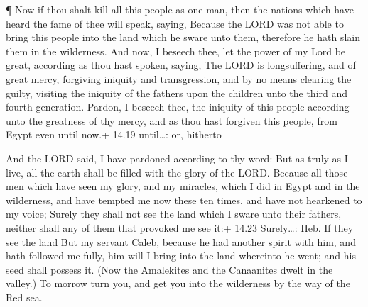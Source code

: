  ¶ Now if thou shalt kill all this people as one man, then
the nations which have heard the fame of thee will speak, saying,
 Because the LORD was not able to bring this people into
the land which he sware unto them, therefore he hath slain them in the
wilderness.  And now, I beseech thee, let the power of my
Lord be great, according as thou hast spoken, saying,  The
LORD is longsuffering, and of great mercy, forgiving iniquity and
transgression, and by no means clearing the guilty, visiting the
iniquity of the fathers upon the children unto the third and fourth
generation.  Pardon, I beseech thee, the iniquity of this
people according unto the greatness of thy mercy, and as thou hast
forgiven this people, from Egypt even until now.+ 14.19 until\ldots: or,
hitherto

 And the LORD said, I have pardoned according to thy word:
 But as truly as I live, all the earth shall be filled with
the glory of the LORD.  Because all those men which have
seen my glory, and my miracles, which I did in Egypt and in the
wilderness, and have tempted me now these ten times, and have not
hearkened to my voice;  Surely they shall not see the land
which I sware unto their fathers, neither shall any of them that
provoked me see it:+ 14.23 Surely\ldots: Heb. If they see the land
 But my servant Caleb, because he had another spirit with
him, and hath followed me fully, him will I bring into the land
whereinto he went; and his seed shall possess it.  (Now the
Amalekites and the Canaanites dwelt in the valley.) To morrow turn you,
and get you into the wilderness by the way of the Red sea.

